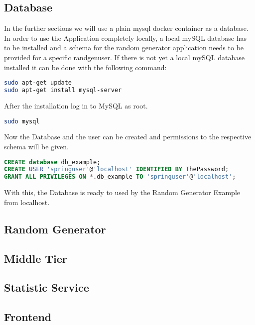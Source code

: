 \subsection{Database}
In the further sections we will use a plain mysql docker container as a database. In order to use the Application completely locally, a local mySQL database has to be installed and a schema for the random generator application needs to be provided for a specific randgenuser.
If there is not yet a local mySQL database installed it can be done with the following command:
\begin{lstlisting}[language=Bash]
sudo apt-get update
sudo apt-get install mysql-server
\end{lstlisting}
After the installation log in to MySQL as root. 
\begin{lstlisting}[language=Bash]
sudo mysql
\end{lstlisting}
Now the Database and the user can be created and permissions to the respective schema will be given.
\begin{lstlisting}[language=SQL]
CREATE database db_example;
CREATE USER 'springuser'@'localhost' IDENTIFIED BY ThePassword;
GRANT ALL PRIVILEGES ON *.db_example TO 'springuser'@'localhost';
\end{lstlisting}
With this, the Database is ready to used by the Random Generator Example from localhost.

\subsection{Random Generator}



\subsection{Middle Tier}




\subsection{Statistic Service}


\subsection{Frontend}


